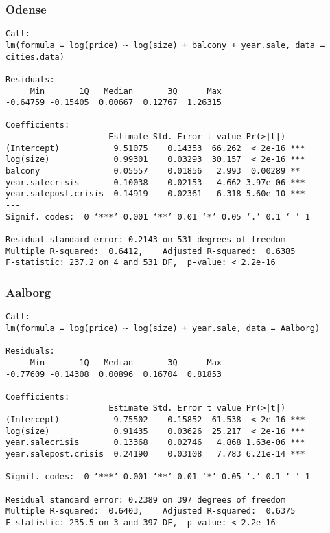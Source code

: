 \subsubsection{Odense}
\begin{lstlisting}
Call:
lm(formula = log(price) ~ log(size) + balcony + year.sale, data = cities.data)

Residuals:
     Min       1Q   Median       3Q      Max 
-0.64759 -0.15405  0.00667  0.12767  1.26315 

Coefficients:
                     Estimate Std. Error t value Pr(>|t|)    
(Intercept)           9.51075    0.14353  66.262  < 2e-16 ***
log(size)             0.99301    0.03293  30.157  < 2e-16 ***
balcony               0.05557    0.01856   2.993  0.00289 ** 
year.salecrisis       0.10038    0.02153   4.662 3.97e-06 ***
year.salepost.crisis  0.14919    0.02361   6.318 5.60e-10 ***
---
Signif. codes:  0 ‘***’ 0.001 ‘**’ 0.01 ‘*’ 0.05 ‘.’ 0.1 ‘ ’ 1

Residual standard error: 0.2143 on 531 degrees of freedom
Multiple R-squared:  0.6412,	Adjusted R-squared:  0.6385 
F-statistic: 237.2 on 4 and 531 DF,  p-value: < 2.2e-16
\end{lstlisting}

\subsubsection{Aalborg}
\begin{lstlisting}
Call:
lm(formula = log(price) ~ log(size) + year.sale, data = Aalborg)

Residuals:
     Min       1Q   Median       3Q      Max 
-0.77609 -0.14308  0.00896  0.16704  0.81853 

Coefficients:
                     Estimate Std. Error t value Pr(>|t|)    
(Intercept)           9.75502    0.15852  61.538  < 2e-16 ***
log(size)             0.91435    0.03626  25.217  < 2e-16 ***
year.salecrisis       0.13368    0.02746   4.868 1.63e-06 ***
year.salepost.crisis  0.24190    0.03108   7.783 6.21e-14 ***
---
Signif. codes:  0 ‘***’ 0.001 ‘**’ 0.01 ‘*’ 0.05 ‘.’ 0.1 ‘ ’ 1

Residual standard error: 0.2389 on 397 degrees of freedom
Multiple R-squared:  0.6403,	Adjusted R-squared:  0.6375 
F-statistic: 235.5 on 3 and 397 DF,  p-value: < 2.2e-16
\end{lstlisting}